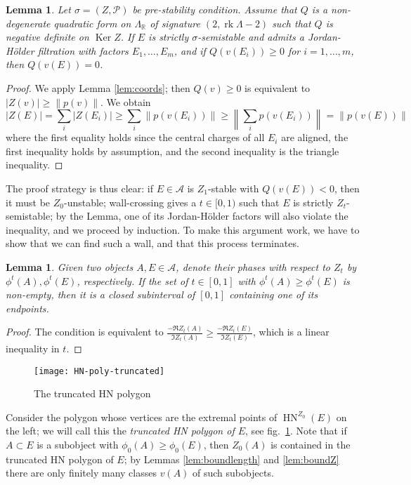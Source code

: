 \documentclass[leqno,11pt,twoside]{amsart}
\newtheorem{Lem}[Thm]{Lemma}
\theoremstyle{definition}
\begin{document}
\begin{Lem} \label{lem:Qpreserved}
Let $\sigma = (Z, {\ensuremath{\mathcal P}})$ be pre-stability condition.
Assume that $Q$ is a non-degenerate quadratic form on $\Lambda_{\ensuremath{\mathbb{R}}}$ of signature $(2, {\mathop{\mathrm{rk}}} \Lambda-2)$ such
that $Q$ is negative definite on ${\mathop{\mathrm{Ker}}\nolimits} Z$. If $E$ is strictly $\sigma$-semistable and admits a Jordan-H\"older filtration with factors $E_1, \dots, E_m$, and if $Q(v(E_i)) \ge 0$ for $i = 1, \dots, m$, then
$Q(v(E)) = 0$.
\end{Lem}
\begin{proof}
We apply Lemma \ref{lem:coords}; then $Q(v) \ge 0$ is equivalent to ${\left\lvert{Z(v)}\right\rvert} \ge {\left\|{p(v)}\right\|}$. We
obtain
\[ {\left\lvert{Z(E)}\right\rvert} = \sum_i {\left\lvert{Z(E_i)}\right\rvert} \ge \sum_i {\left\|{p(v(E_i))}\right\|} \ge {\left\|{\sum_i p(v(E_i))}\right\|} = {\left\|{p(v(E))}\right\|} \]
where the first equality holds since the central charges of all $E_i$ are aligned, the first inequality holds by assumption, and the second inequality is the triangle inequality.
\end{proof}

The proof strategy is thus clear: if $E \in {\ensuremath{\mathcal A}}$ is $Z_1$-stable with $Q(v(E)) < 0$, then it must be
$Z_0$-unstable; wall-crossing gives a $t \in [0, 1)$ such that $E$ is strictly $Z_t$-semistable; by the Lemma, one of its Jordan-H\"older factors will also violate the inequality, and we proceed by induction. To make this argument work, we have to show that we can find such a wall, and that this process terminates.

\begin{Lem} \label{lem:duh}
Given two objects $A, E \in {\ensuremath{\mathcal A}}$, denote their phases with respect to $Z_t$ by
$\phi^t(A), \phi^t(E)$, respectively. If the set of $t \in [0,1]$ with $\phi^t(A) \ge \phi^t(E)$ is
non-empty, then it is a closed subinterval of $[0,1]$ containing one of its endpoints.
\end{Lem}
\begin{proof}
The condition is equivalent to $\frac{-\Re Z_t(A)}{\Im Z_t(A)} \ge \frac{-\Re Z_t(E)}{\Im Z_t(E)}$,
which is a linear inequality in $t$.
\end{proof}

\begin{figure}[htb]
  \begin{center}
        \texttt{[image: HN-poly-truncated]}
    \caption{The truncated HN polygon}
    \label{fig:HNpolytruncated}
  \end{center}
\end{figure}
Consider the polygon whose vertices are the extremal points of ${\mathop{\mathrm{HN}}\nolimits}^{Z_0}(E)$ on the left; we will call this the
\emph{truncated HN polygon of $E$}, see fig.~\ref{fig:HNpolytruncated}. Note that if $A \subset E$ is a
subobject with $\phi_0(A) \ge \phi_0(E)$, then $Z_0(A)$ is contained in the truncated HN polygon of
$E$; by Lemmas \ref{lem:boundlength} and \ref{lem:boundZ} there are only finitely
many classes $v(A)$ of such subobjects.
\end{document}
